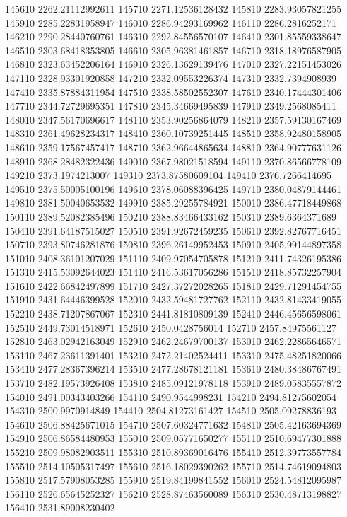 {145610 2262.21112992611
145710 2271.12536128432
145810 2283.93057821255
145910 2285.22831958947
146010 2286.94293169962
146110 2286.2816252171
146210 2290.28440760761
146310 2292.84556570107
146410 2301.85559338647
146510 2303.68418353805
146610 2305.96381461857
146710 2318.18976587905
146810 2323.63452206164
146910 2326.13629139476
147010 2327.22151453026
147110 2328.93301920858
147210 2332.09553226374
147310 2332.7394908939
147410 2335.87884311954
147510 2338.58502552307
147610 2340.17444301406
147710 2344.72729695351
147810 2345.34669495839
147910 2349.2568085411
148010 2347.56170696617
148110 2353.90256864079
148210 2357.59130167469
148310 2361.49628234317
148410 2360.10739251445
148510 2358.92480158905
148610 2359.17567457417
148710 2362.96644865634
148810 2364.90777631126
148910 2368.28482322436
149010 2367.98021518594
149110 2370.86566778109
149210 2373.1974213007
149310 2373.87580609104
149410 2376.7266414695
149510 2375.50005100196
149610 2378.06088396425
149710 2380.04879144461
149810 2381.50040653532
149910 2385.29255784921
150010 2386.47718449868
150110 2389.52082385496
150210 2388.83466433162
150310 2389.6364371689
150410 2391.64187515027
150510 2391.92672459235
150610 2392.82767716451
150710 2393.80746281876
150810 2396.26149952453
150910 2405.99144897358
151010 2408.36101207029
151110 2409.97054705878
151210 2411.74326195386
151310 2415.53092644023
151410 2416.53617056286
151510 2418.85732257904
151610 2422.66842497899
151710 2427.37272028265
151810 2429.71291454755
151910 2431.64446399528
152010 2432.59481727762
152110 2432.81433419055
152210 2438.71207867067
152310 2441.81810809139
152410 2446.45656598061
152510 2449.73014518971
152610 2450.0428756014
152710 2457.84975561127
152810 2463.02942163049
152910 2462.24679700137
153010 2462.22865646571
153110 2467.23611391401
153210 2472.21402524411
153310 2475.48251820066
153410 2477.28367396214
153510 2477.28678121181
153610 2480.38486767491
153710 2482.19573926408
153810 2485.09121978118
153910 2489.05835557872
154010 2491.00343403266
154110 2490.9544998231
154210 2494.81275602054
154310 2500.9970914849
154410 2504.81273161427
154510 2505.09278836193
154610 2506.88425671015
154710 2507.60324771632
154810 2505.42163694369
154910 2506.86584480953
155010 2509.05771650277
155110 2510.69477301888
155210 2509.98082903511
155310 2510.89369016476
155410 2512.39773557784
155510 2514.10505317497
155610 2516.18029390262
155710 2514.74619094803
155810 2517.57908053285
155910 2519.84199841552
156010 2524.54812095987
156110 2526.65645252327
156210 2528.87463560089
156310 2530.48713198827
156410 2531.89008230402
}
